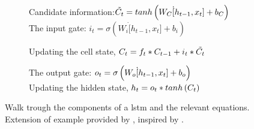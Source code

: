 \begin{figure*}[h]
\begin{subfigure}[b]{0.475\textwidth}
        \end{subfigure}
        \quad
       \begin{subfigure}[b]{0.475\textwidth}   
            \centering 
            
            \caption{{\small Candidate information:\newline $\Tilde{C_t} = tanh \left( W_C \dot [ h_{t-1}, x_t ] + b_C \right)$  \newline  The input gate: $i_t = \sigma \left( W_i \dot [ h_{t-1}, x_t ] + b_i \right)$}}
            \label{fig:input_gate}
        \end{subfigure}
        \begin{subfigure}[b]{0.475\textwidth}   
            \centering 
             
            \caption[]%
            {{\small Updating the cell state, $C_t = f_t * C_{t-1} + i_t*\Tilde{C_t}$}}
            \label{fig:update_memory}
        \end{subfigure}
        \quad
        \begin{subfigure}[b]{0.475\textwidth}
            \centering
            
            \caption[]
            {{\small The output gate: $ \protect o_t =\sigma \left( W_o \dot [ h_{t-1}, x_t ] + b_o\right) $ \\ Updating the hidden state, $ \protect h_t = o_t*tanh \left( C_t \right) $ }}
            \label{fig:output_gate}
        \end{subfigure}
        \caption{{Walk trough the components of a \acrshort{lstm} and the relevant equations. Extension of example provided by , inspired by .}}
        \label{fig:LSTM}
    \end{figure*}